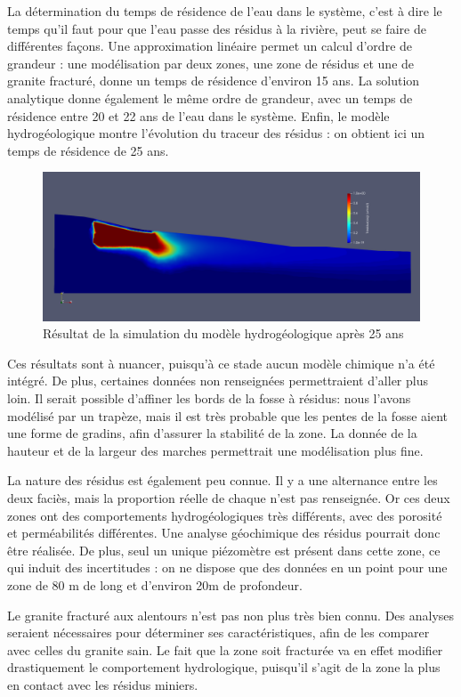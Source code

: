 \documentclass{article}
\begin{document}
La détermination du temps de résidence de l'eau dans le système, c'est à dire le temps qu'il faut pour que l'eau passe des résidus à la rivière, peut se faire de différentes façons. Une approximation linéaire permet un calcul d’ordre de grandeur : une modélisation par deux zones, une zone de résidus et une de granite fracturé, donne un temps de résidence d’environ 15 ans. La solution analytique donne également le même ordre de grandeur, avec un temps de résidence entre 20 et 22 ans de l'eau dans le système. Enfin, le modèle hydrogéologique montre l’évolution du traceur des résidus : on obtient ici un temps de résidence de 25 ans.

\begin{figure}[H]
    \centering
    \includegraphics[width=0.8\linewidth]{III_B_3_8.png}
    \caption{Résultat de la simulation du modèle hydrogéologique après 25 ans}
    \label{hytec_hydro_25ans}
\end{figure}

Ces résultats sont à nuancer, puisqu’à ce stade aucun modèle chimique n’a été intégré. De plus, certaines données non renseignées permettraient d’aller plus loin. Il serait possible d’affiner les bords de la fosse à résidus: nous l’avons modélisé par un trapèze, mais il est très probable que les pentes de la fosse aient une forme de gradins, afin d’assurer la stabilité de la zone. La donnée de la hauteur et de la largeur des marches permettrait une modélisation plus fine.

La nature des résidus est également peu connue. Il y a une alternance entre les deux faciès, mais la proportion réelle de chaque n’est pas renseignée. Or ces deux zones ont des comportements hydrogéologiques très différents, avec des porosité et perméabilités différentes. Une analyse géochimique des résidus pourrait donc être réalisée. De plus, seul un unique piézomètre est présent dans cette zone, ce qui induit des incertitudes : on ne dispose que des données en un point pour une zone de 80 m de long et d’environ 20m de profondeur.

Le granite fracturé aux alentours n’est pas non plus très bien connu. Des analyses seraient nécessaires pour déterminer ses caractéristiques, afin de les comparer avec celles du granite sain. Le fait que la zone soit fracturée va en effet modifier drastiquement le comportement hydrologique, puisqu’il s’agit de la zone la plus en contact avec les résidus miniers.
\end{document}
